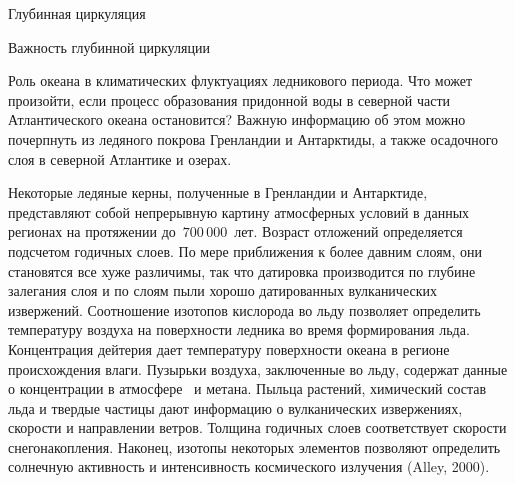 \begin{chapter}{Глубинная циркуляция}
\begin{section}{Важность глубинной циркуляции}
\begin{paragraph}{Роль океана в климатических флуктуациях ледникового периода.}
Что может произойти, если процесс образования
придонной воды в северной части Атлантического океана остановится? 
Важную информацию об этом можно почерпнуть из ледяного покрова Гренландии
и Антарктиды, а также осадочного слоя в северной Атлантике и озерах.
%

Некоторые ледяные керны, полученные в Гренландии и Антарктиде, представляют
собой непрерывную картину атмосферных 
условий в данных регионах на протяжении
до~$700\,000$~лет. Возраст отложений определяется подсчетом годичных слоев.
По мере приближения к более давним слоям, они становятся все хуже различимы,
так что датировка производится по глубине залегания слоя и по слоям пыли
хорошо датированных вулканических извержений. Соотношение изотопов кислорода
во льду позволяет определить температуру воздуха на поверхности ледника во
время формирования льда. Концентрация дейтерия дает температуру поверхности
океана в регионе происхождения влаги. Пузырьки воздуха, заключенные во льду,
содержат данные о концентрации в атмосфере~\COtwo{} и метана.
Пыльца растений, химический состав льда и твердые частицы дают информацию 
о вулканических извержениях, скорости и направлении ветров. 
Толщина годичных слоев соответствует скорости снегонакопления. 
Наконец, изотопы некоторых элементов позволяют определить
солнечную активность и интенсивность космического излучения (Alley, 2000).
%


\end{paragraph}
\end{section}
\end{chapter}
